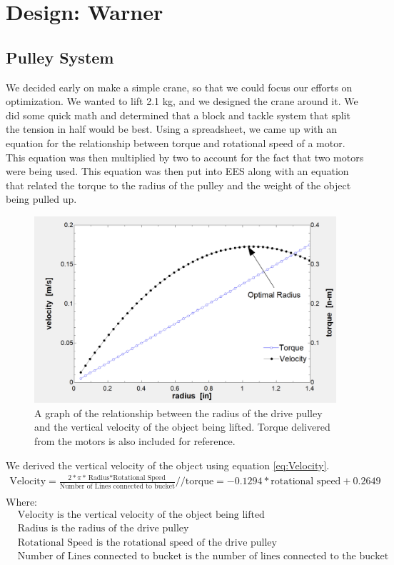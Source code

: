 \documentclass[letterpaper, 12pt]{article}
\begin{document}
\section{Design: Warner}

\subsection{Pulley System}
\label{sec:Pulley}
We decided early on make a simple crane, so that we could focus our efforts on optimization.
We wanted to lift 2.1 kg, and we designed the crane around it. 
We did some quick math and determined that a block and tackle system that split the tension in half would be best. 
Using a spreadsheet, we came up with an equation for the relationship between torque and rotational speed of a motor. 
This equation was then multiplied by two to account for the fact that two motors were being used. 
This equation was then put into EES along with an equation that related the torque to the radius of the pulley and the weight of the object being pulled up.

\begin{figure}[H]
    \centering
    \includegraphics[width =.45\linewidth]{Torque_Speed.png}
    \caption{A graph of the relationship between the radius of the drive pulley and the vertical velocity of the object being lifted. Torque delivered from the motors is also included for reference.}
    \label{fig:Torque_Speed}
\end{figure}

We derived the vertical velocity of the object using equation \ref{eq:Velocity}.
\begin{equation}
    \begin{split}
        \text{Velocity}=\frac{2*\pi*{\text{Radius}*\text{Rotational Speed}}}{\text{Number of Lines connected to bucket}}     \label{eq:Velocity} //
        \text{torque}=-0.1294*\text{rotational speed}+0.2649 \\
    \end{split}
\end{equation}
Where:
\begin{equation}
    \begin{split}
       & \text{Velocity} \text{ is the vertical velocity of the object being lifted} \\
        &\text{Radius}  \text{ is the radius of the drive pulley} \\
        &\text{Rotational Speed}  \text{ is the rotational speed of the drive pulley} \\
        &\text{Number of Lines connected to bucket}  \text{ is the number of lines connected to the bucket}
    \end{split}
\end{equation}
\end{document}
